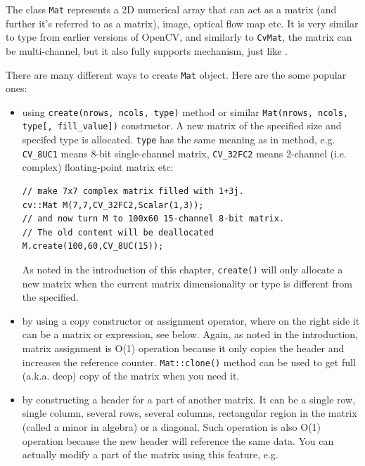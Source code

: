 The class \texttt{Mat} represents a 2D numerical array that can act as a matrix (and further it's referred to as a matrix), image, optical flow map etc. It is very similar to  type from earlier versions of OpenCV, and similarly to \texttt{CvMat}, the matrix can be multi-channel, but it also fully supports  mechanism, just like .

There are many different ways to create \texttt{Mat} object. Here are the some popular ones:
\begin{itemize}
\item using \texttt{create(nrows, ncols, type)} method or
    similar \texttt{Mat(nrows, ncols, type[, fill\_value])} constructor.
    A new matrix of the specified size and specifed type is allocated.
    \texttt{type} has the same meaning as in  method,
    e.g. \texttt{CV\_8UC1} means 8-bit single-channel matrix,
    \texttt{CV\_32FC2} means 2-channel (i.e. complex) floating-point matrix etc:
        
\begin{lstlisting}
// make 7x7 complex matrix filled with 1+3j.
cv::Mat M(7,7,CV_32FC2,Scalar(1,3));
// and now turn M to 100x60 15-channel 8-bit matrix.
// The old content will be deallocated
M.create(100,60,CV_8UC(15));
\end{lstlisting}
        
    As noted in the introduction of this chapter, \texttt{create()}
    will only allocate a new matrix when the current matrix dimensionality
    or type is different from the specified.
        
\item by using a copy constructor or assignment operator, where on the right side it can
      be a matrix or expression, see below. Again, as noted in the introduction,
      matrix assignment is O(1) operation because it only copies the header
      and increases the reference counter. \texttt{Mat::clone()} method can be used to get full
      (a.k.a. deep) copy of the matrix when you need it.
          
\item by constructing a header for a part of another matrix. It can be a single row, single column,
      several rows, several columns, rectangular region in the matrix (called a minor in algebra) or
      a diagonal. Such operation is also O(1) operation because the new header will reference the same data.
      You can actually modify a part of the matrix using this feature, e.g.
          

\end{itemize}

